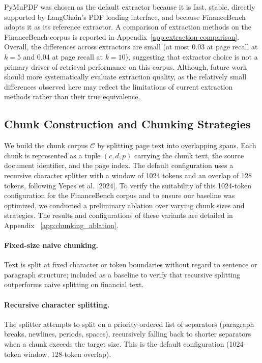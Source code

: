 \documentclass[12pt,twoside,maitrise]{dms}
\theoremstyle{definition}
\numberwithin{equation}{section}
\numberwithin{table}{chapter}
\numberwithin{figure}{chapter}
\begin{document}
PyMuPDF was chosen as the default extractor because it is fast, stable, directly
supported by LangChain's PDF loading interface, and because FinanceBench
\citep{islam2023financebench} adopts it as its reference extractor. A comparison of
extraction methods on the FinanceBench corpus is reported in
Appendix~\ref{app:extraction-comparison}. Overall, the differences across extractors
are small (at most 0.03 at page recall at $k=5$ and 0.04 at page recall at $k=10$),
suggesting that extractor choice is not a primary driver of retrieval performance on
this corpus. Although, future work should more systematically evaluate extraction quality, as the relatively small differences observed here may reflect the limitations of current extraction methods rather than their true equivalence.
\subsection{Chunk Construction and Chunking Strategies}
\label{sec:chunking_strategies}

We build the chunk corpus $\mathcal{C}$ by splitting page text into overlapping spans.
Each chunk is represented as a tuple $(c, d, p)$ carrying the chunk text, the source
document identifier, and the page index. The default configuration uses a recursive character splitter with a window of 1024 tokens and an overlap of 128 tokens, following Yepes et al. [2024]. To verify the suitability of this 1024-token configuration for the FinanceBench corpus and to ensure our baseline was optimized, we conducted a preliminary ablation over varying chunk sizes and strategies. The results and configurations of these variants are detailed in Appendix ~\ref{app:chunking_ablation}.

\paragraph{Fixed-size naive chunking.} Text is split at fixed character or token
boundaries without regard to sentence or paragraph structure; included as a baseline to
verify that recursive splitting outperforms naive splitting on financial text.

\paragraph{Recursive character splitting.} The splitter attempts to split on a
priority-ordered list of separators (paragraph breaks, newlines, periods, spaces),
recursively falling back to shorter separators when a chunk exceeds the target size.
This is the default configuration (1024-token window, 128-token overlap).
\end{document}
